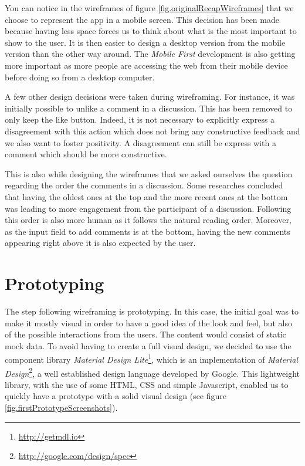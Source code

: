 \documentclass[a4paper,12pt,twoside]{article}
\begin{document}
You can notice in the wireframes of figure \ref{fig.originalRecapWireframes} that we choose to represent the app in a mobile screen.
This decision has been made because having less space forces us to think about what is the most important to show to the user.
It is then easier to design a desktop version from the mobile version than the other way around.
The \emph{Mobile First} development is also getting more important as more people are accessing the web from their mobile device before doing so from a desktop computer.

A few other design decisions were taken during wireframing.
For instance, it was initially possible to unlike a comment in a discussion.
This has been removed to only keep the like button.
Indeed, it is not necessary to explicitly express a disagreement with this action which does not bring any constructive feedback and we also want to foster positivity.
A disagreement can still be express with a comment which should be more constructive.

This is also while designing the wireframes that we asked ourselves the question regarding the order the comments in a discussion.
Some researches \cite{mabande2010designing} concluded that having the oldest ones at the top and the more recent ones at the bottom was leading to more engagement from the participant of a discussion.
Following this order is also more human as it follows the natural reading order.
Moreover, as the input field to add comments is at the bottom, having the new comments appearing right above it is also expected by the user.


\section{Prototyping}
The step following wireframing is prototyping.
In this case, the initial goal was to make it mostly visual in order to have a good idea of the look and feel, but also of the possible interactions from the users.
The content would consist of static mock data.
To avoid having to create a full visual design, we decided to use the component library \emph{Material Design Lite}\footnote{\url{http://getmdl.io}}, which is an implementation of \emph{Material Design}\footnote{\url{http://google.com/design/spec}}, a well established design language developed by Google.
This lightweight library, with the use of some HTML, CSS and simple Javascript, enabled us to quickly have a prototype with a solid visual design (see figure \ref{fig.firstPrototypeScreenshots}).
\end{document}
